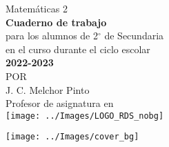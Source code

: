 \thispagestyle{empty}
\begin{center}
    \vspace{4cm}
    {\Huge Matem\'aticas 2}\\
    \vspace{1cm}
    \normalsize
    \textbf{\large Cuaderno de trabajo}\\
    para los alumnos de 2$^\circ$ de  Secundaria\\
    en el curso durante el ciclo escolar\\
    \textbf{2022-2023}\\
    \vspace{2cm}
    \small POR\\
    \Large J. C. Melchor Pinto\\[0.5em]
    \normalsize Profesor de asignatura en\\
    \vspace{2cm}
    \texttt{[image: ../Images/LOGO\_RDS\_nobg]}\\
    \vspace{1.8cm}
\end{center}
\texttt{[image: ../Images/cover\_bg]}